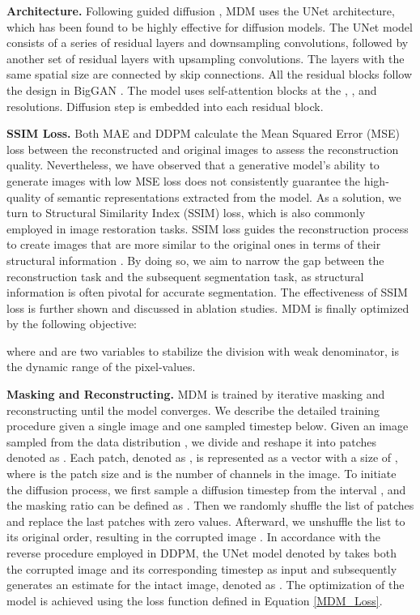 \documentclass{article} \usepackage{iclr2024_conference,times}
\begin{document}
\textbf{Architecture.}
Following guided diffusion \citep{DBLP:conf/nips/DhariwalN21}, MDM uses the UNet architecture, which has been found to be highly effective for diffusion models. 
The UNet model consists of a series of residual layers and downsampling convolutions, followed by another set of residual layers with upsampling convolutions. The layers with the same spatial size are connected by skip connections. All the residual blocks follow the design in BigGAN \citep{DBLP:conf/iclr/BrockDS19}. The model uses self-attention blocks at the , , and  resolutions. Diffusion step  is embedded into each residual block.

\textbf{SSIM Loss.} Both MAE and DDPM calculate the Mean Squared Error (MSE) loss between the reconstructed and original images to assess the reconstruction quality. Nevertheless, we have observed that a generative model's ability to generate images with low MSE loss does not consistently guarantee the high-quality of semantic representations extracted from the model.
As a solution, we turn to Structural Similarity Index (SSIM) loss, which is also commonly employed in image restoration tasks. SSIM loss guides the reconstruction process to create images that are more similar to the original ones in terms of their structural information \citep{DBLP:journals/tip/WangBSS04}. By doing so, we aim to narrow the gap between the reconstruction task and the subsequent segmentation task, as structural information is often pivotal for accurate segmentation. The effectiveness of SSIM loss is further shown and discussed in ablation studies. MDM is finally optimized by the following objective:

where  and  are two variables to stabilize the division with weak denominator,  is the dynamic range of the pixel-values.

\textbf{Masking and Reconstructing.}
MDM is trained by iterative masking and reconstructing until the model converges. We describe the detailed training procedure given a single image and one sampled timestep below.
Given an image  sampled from the data distribution , we divide and reshape it into  patches denoted as . Each patch, denoted as , is represented as a vector with a size of , where  is the patch size and  is the number of channels in the image. To initiate the diffusion process, we first sample a diffusion timestep  from the interval , and the masking ratio  can be defined as . Then we randomly shuffle the list of patches and replace the last  patches with zero values. Afterward, we unshuffle the list to its original order, resulting in the corrupted image . In accordance with the reverse procedure employed in DDPM, the UNet model denoted by  takes both the corrupted image  and its corresponding timestep  as input and subsequently generates an estimate for the intact image, denoted as . The optimization of the  model is achieved using the  loss function defined in Equation \ref{MDM_Loss}. 
\end{document}
